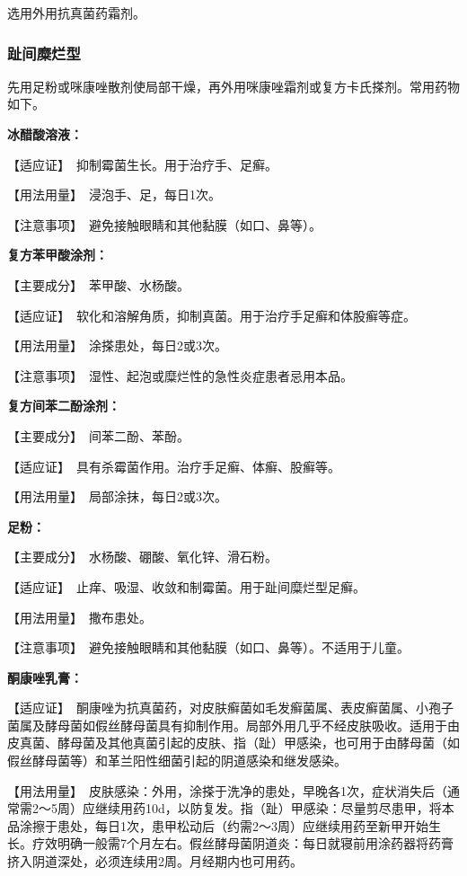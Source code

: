 选用外用抗真菌药霜剂。

\subsubsection{趾间糜烂型}

先用足粉或咪康唑散剂使局部干燥，再外用咪康唑霜剂或复方卡氏搽剂。常用药物如下。

\textbf{冰醋酸溶液：}

【适应证】　抑制霉菌生长。用于治疗手、足癣。

【用法用量】　浸泡手、足，每日1次。

【注意事项】　避免接触眼睛和其他黏膜（如口、鼻等）。

\textbf{复方苯甲酸涂剂：}

【主要成分】　苯甲酸、水杨酸。

【适应证】　软化和溶解角质，抑制真菌。用于治疗手足癣和体股癣等症。

【用法用量】　涂搽患处，每日2或3次。

【注意事项】　湿性、起泡或糜烂性的急性炎症患者忌用本品。

\textbf{复方间苯二酚涂剂：}

【主要成分】　间苯二酚、苯酚。

【适应证】　具有杀霉菌作用。治疗手足癣、体癣、股癣等。

【用法用量】　局部涂抹，每日2或3次。

\textbf{足粉：}

【主要成分】　水杨酸、硼酸、氧化锌、滑石粉。

【适应证】　止痒、吸湿、收敛和制霉菌。用于趾间糜烂型足癣。

【用法用量】　撒布患处。

【注意事项】　避免接触眼睛和其他黏膜（如口、鼻等）。不适用于儿童。

\textbf{酮康唑乳膏：}

【适应证】　酮康唑为抗真菌药，对皮肤癣菌如毛发癣菌属、表皮癣菌属、小孢子菌属及酵母菌如假丝酵母菌具有抑制作用。局部外用几乎不经皮肤吸收。适用于由皮真菌、酵母菌及其他真菌引起的皮肤、指（趾）甲感染，也可用于由酵母菌（如假丝酵母菌等）和革兰阳性细菌引起的阴道感染和继发感染。

【用法用量】　皮肤感染：外用，涂搽于洗净的患处，早晚各1次，症状消失后（通常需2～5周）应继续用药10d，以防复发。指（趾）甲感染：尽量剪尽患甲，将本品涂擦于患处，每日1次，患甲松动后（约需2～3周）应继续用药至新甲开始生长。疗效明确一般需7个月左右。假丝酵母菌阴道炎：每日就寝前用涂药器将药膏挤入阴道深处，必须连续用2周。月经期内也可用药。

